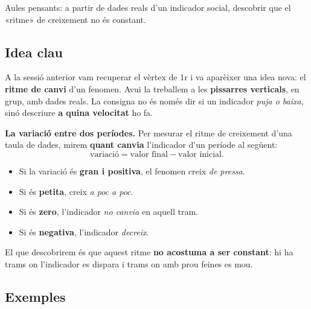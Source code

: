 %
{Aules pensants: a partir de dades reals d'un indicador social, descobrir que el «ritme» de creixement no és constant.}

\subsection{Idea clau}

A la sessió anterior vam recuperar el vèrtex de 1r i va aparèixer una idea nova: el
\textbf{ritme de canvi} d'un fenomen. Avui la treballem a les \textbf{pissarres
verticals}, en grup, amb dades reals. La consigna no és només dir si un indicador
\emph{puja o baixa}, sinó descriure \textbf{a quina velocitat} ho fa.

\begin{idea}
\textbf{La variació entre dos períodes.} Per mesurar el ritme de creixement d'una
taula de dades, mirem \textbf{quant canvia} l'indicador d'un període al següent:
\[
\text{variació} = \text{valor final} - \text{valor inicial}.
\]
\begin{itemize}[leftmargin=1.4em, itemsep=2pt]
  \item Si la variació és \textbf{gran i positiva}, el fenomen creix \emph{de pressa}.
  \item Si és \textbf{petita}, creix \emph{a poc a poc}.
  \item Si és \textbf{zero}, l'indicador \emph{no canvia} en aquell tram.
  \item Si és \textbf{negativa}, l'indicador \emph{decreix}.
\end{itemize}
El que descobrirem és que aquest ritme \textbf{no acostuma a ser constant}: hi ha
trams on l'indicador es dispara i trams on amb prou feines es mou.
\end{idea}

\subsection{Exemples}

